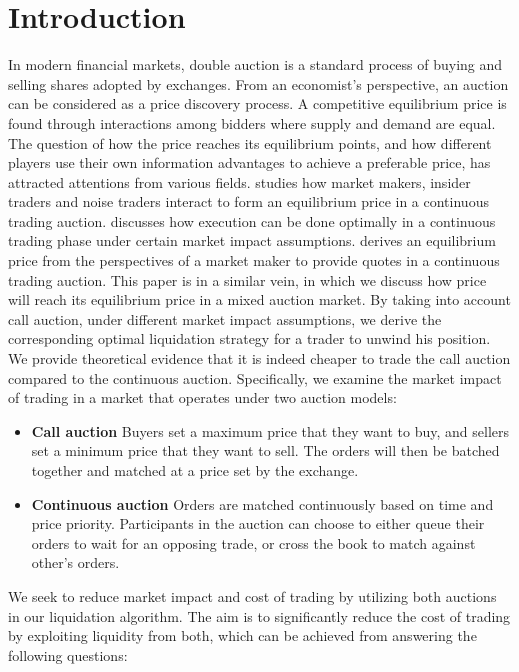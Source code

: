 
\section{Introduction}
In modern financial markets, double auction is a standard process of buying and selling shares adopted by exchanges. From an economist's perspective, an auction can be considered as a price discovery process. A competitive equilibrium price is found through interactions among bidders where supply and demand are equal. The question of how the price reaches its equilibrium points, and how different players use their own information advantages to achieve a preferable price, has attracted attentions from various fields. \cite{Kyle1985} studies how market makers, insider traders and noise traders interact to form an equilibrium price in a continuous trading auction. \cite{Almgren2000} discusses how execution can be done optimally in a continuous trading phase under certain market impact assumptions. \cite{Avellaneda2008} derives an equilibrium price from the perspectives of a market maker to provide quotes in a continuous trading auction. This paper is in a similar vein, in which we discuss how price will reach its equilibrium price in a mixed auction market. By taking into account call auction, under different market impact assumptions, we derive the corresponding optimal liquidation strategy for a trader to unwind his position. We provide theoretical evidence that it is indeed cheaper to trade the call auction compared to the continuous auction. Specifically, we examine the market impact of trading in a market that operates under two auction models:

\begin{itemize}
  \item \textbf{Call auction} Buyers set a maximum price that they want to buy, and sellers set a minimum price that they want to sell. The orders will then be batched together and matched at a price set by the exchange.
  \item \textbf{Continuous auction} Orders are matched continuously based on time and price priority. Participants in the auction can choose to either queue their orders to wait for an opposing trade, or cross the book to match against other's orders.
\end{itemize}

We seek to reduce market impact and cost of trading by utilizing both auctions in our liquidation algorithm. The aim is to significantly reduce the cost of trading by exploiting liquidity from both, which can be achieved from answering the following questions:

